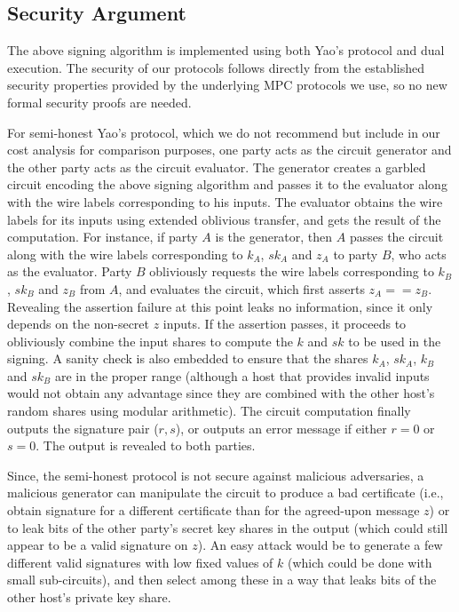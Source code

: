 \subsection{Security Argument}\label{sec:security}

The above signing algorithm is implemented using both Yao's protocol and dual execution.  The security of our protocols follows directly from the established security properties provided by the underlying MPC protocols we use, so no new formal security proofs are needed.

For semi-honest Yao's protocol, which we do not recommend but include in our cost analysis for comparison purposes,
one party acts as the circuit generator and the other party acts as the circuit evaluator. The generator creates a garbled circuit encoding the above signing algorithm and passes it to the evaluator along with the wire labels corresponding to his inputs. The evaluator obtains the wire labels for its inputs using extended oblivious transfer, and gets the result of the computation. For instance, if party $A$ is the generator, then $A$ passes the circuit along with the wire labels corresponding to $k_A$, $sk_A$ and $z_A$ to party $B$, who acts as the evaluator. Party $B$ obliviously requests the wire labels corresponding to $k_B$, $sk_B$ and $z_B$ from $A$, and evaluates the circuit, which first asserts $z_A == z_B$. Revealing the assertion failure at this point leaks no information, since it only depends on the non-secret $z$ inputs. If the assertion passes, it proceeds to obliviously combine the input shares to compute the $k$ and $sk$ to be used in the signing. A sanity check is also embedded to ensure that the shares $k_A$, $sk_A$, $k_B$ and $sk_B$ are in the proper range (although a host that provides invalid inputs would not obtain any advantage since they are combined with the other host's random shares using modular arithmetic). The circuit computation finally outputs the signature pair ($r, s$), or outputs an error message if either $r = 0$ or $s = 0$. The output is revealed to both parties. 

Since, the semi-honest protocol is not secure against malicious adversaries, a malicious generator can manipulate the circuit to produce a bad certificate (i.e., obtain signature for a different certificate than for the agreed-upon message $z$) or to leak bits of the other party's secret key shares in the output (which could still appear to be a valid signature on $z$).  An easy attack would be to generate a few different valid signatures with low fixed values of $k$ (which could be done with small sub-circuits), and then select among these in a way that leaks bits of the other host's private key share.

